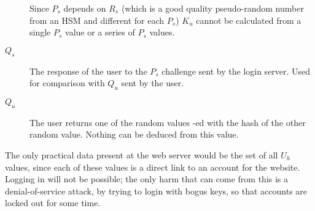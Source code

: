 \begin{description}
				Since $P_s$ depends on $R_s$
				(which is a good quality pseudo-random number from an HSM and different for each $P_s$)
				$K_u$ cannot be calculated from a single $P_s$ value or a series of $P_s$ values.
\item[$Q_s$]	The response of the user to the $P_s$ challenge sent by the login server.
				Used for comparison with $Q_u$ sent by the user.
\item[$Q_u$]	The user returns one of the random values \XOR-ed with the hash of the other random value.
				Nothing can be deduced from this value.
\end{description}
The only practical data present at the web server would be the set of all $U_h$ values,
since each of these values is a direct link to an account for the website.
Logging in will not be possible;
the only harm that can come from this is a denial-of-service attack,
by trying to login with bogus keys,
so that accounts are locked out for some time.
